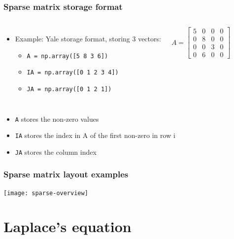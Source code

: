 \begin{frame}[fragile]
  \frametitle{Sparse matrix storage format}
  \begin{columns}
  \begin{itemize}
    \item Example: Yale storage format, storing 3 vectors:
    \begin{itemize}
      \item \lstinline$A = np.array([5 8 3 6])$
      \item \lstinline$IA = np.array([0 1 2 3 4])$
      \item \lstinline$JA = np.array([0 1 2 1])$
    \end{itemize}
  \end{itemize}
  \[
   A = 
   \begin{bmatrix}
    5 & 0 & 0 & 0\\
    0 & 8 & 0 & 0\\
    0 & 0 & 3 & 0\\
    0 & 6 & 0 & 0
    \end{bmatrix}
  \]
  \end{columns}
  \begin{itemize}
    \item \lstinline$A$ stores the non-zero values
    \item \lstinline$IA$ stores the index in A of the first non-zero in row i
    \item \lstinline$JA$ stores the column index
\end{itemize}
\end{frame}

\begin{frame}[fragile]
  \frametitle{Sparse matrix layout examples}
  \begin{center}
   \texttt{[image: sparse-overview]}
  \end{center}
\end{frame}

\section{Laplace's equation}
